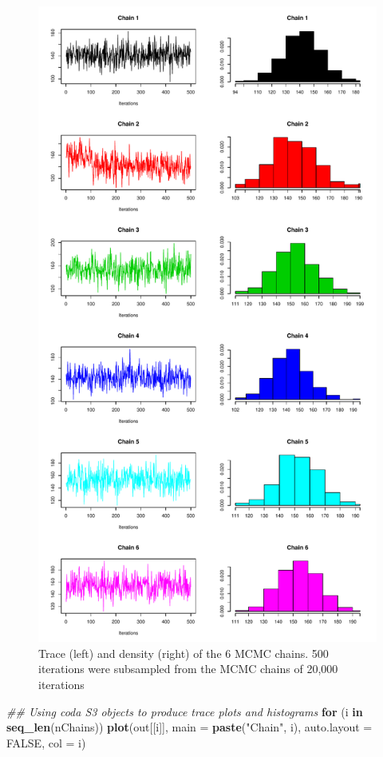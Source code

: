 \documentclass[
]{article}
\newenvironment{Shaded}{\begin{snugshade}}{\end{snugshade}}
\newcommand{\CommentTok}[1]{\textcolor[rgb]{0.56,0.35,0.01}{\textit{#1}}}
\newcommand{\ControlFlowTok}[1]{\textcolor[rgb]{0.13,0.29,0.53}{\textbf{#1}}}
\newcommand{\DataTypeTok}[1]{\textcolor[rgb]{0.13,0.29,0.53}{#1}}
\newcommand{\KeywordTok}[1]{\textcolor[rgb]{0.13,0.29,0.53}{\textbf{#1}}}
\newcommand{\NormalTok}[1]{#1}
\newcommand{\OtherTok}[1]{\textcolor[rgb]{0.56,0.35,0.01}{#1}}
\newcommand{\StringTok}[1]{\textcolor[rgb]{0.31,0.60,0.02}{#1}}
\begin{document}
\begin{figure}
\includegraphics[width=0.7\linewidth]{F1000TAGMworkflow_rev1_files/figure-latex/mcmctraceHidden-1} \caption{Trace (left) and density (right) of the 6 MCMC chains. 500 iterations were subsampled from the MCMC chains of 20,000 iterations}\label{fig:mcmctraceHidden}
\end{figure}

\begin{Shaded}
\begin{Highlighting}[]
\CommentTok{## Using coda S3 objects to produce trace plots and histograms}
\ControlFlowTok{for}\NormalTok{ (i }\ControlFlowTok{in} \KeywordTok{seq_len}\NormalTok{(nChains))}
    \KeywordTok{plot}\NormalTok{(out[[i]], }\DataTypeTok{main =} \KeywordTok{paste}\NormalTok{(}\StringTok{"Chain"}\NormalTok{, i), }\DataTypeTok{auto.layout =} \OtherTok{FALSE}\NormalTok{, }\DataTypeTok{col =}\NormalTok{ i)}
\end{Highlighting}
\end{Shaded}
\end{document}
